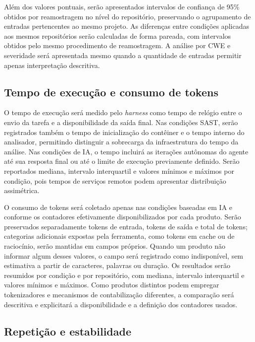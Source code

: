 Além dos valores pontuais, serão apresentados intervalos de confiança de 95\% obtidos por reamostragem no nível do repositório, preservando o agrupamento de entradas pertencentes ao mesmo projeto. As diferenças entre condições aplicadas aos mesmos repositórios serão calculadas de forma pareada, com intervalos obtidos pelo mesmo procedimento de reamostragem. A análise por CWE e severidade será apresentada mesmo quando a quantidade de entradas permitir apenas interpretação descritiva.

\subsection{Tempo de execução e consumo de tokens}\label{subsec:tempo-tokens-metodologia}

O tempo de execução será medido pelo \textit{harness} como tempo de relógio entre o envio da tarefa e a disponibilidade da saída final. Nas condições SAST, serão registrados também o tempo de inicialização do contêiner e o tempo interno do analisador, permitindo distinguir a sobrecarga da infraestrutura do tempo da análise. Nas condições de IA, o tempo incluirá as iterações autônomas do agente até sua resposta final ou até o limite de execução previamente definido. Serão reportados mediana, intervalo interquartil e valores mínimos e máximos por condição, pois tempos de serviços remotos podem apresentar distribuição assimétrica.

O consumo de tokens será coletado apenas nas condições baseadas em IA e conforme os contadores efetivamente disponibilizados por cada produto. Serão preservados separadamente tokens de entrada, tokens de saída e total de tokens; categorias adicionais expostas pela ferramenta, como tokens em cache ou de raciocínio, serão mantidas em campos próprios. Quando um produto não informar algum desses valores, o campo será registrado como indisponível, sem estimativa a partir de caracteres, palavras ou duração. Os resultados serão resumidos por condição e por repositório, com mediana, intervalo interquartil e valores mínimos e máximos. Como produtos distintos podem empregar tokenizadores e mecanismos de contabilização diferentes, a comparação será descritiva e explicitará a disponibilidade e a definição dos contadores usados.

\subsection{Repetição e estabilidade}\label{subsec:testes-ensaios}

